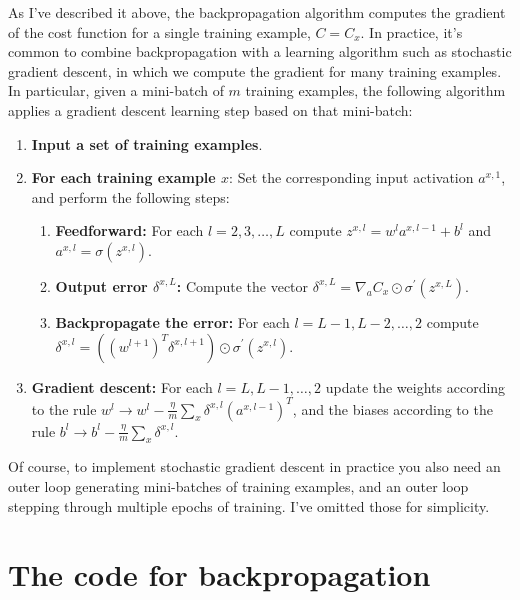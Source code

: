 As I've described it above, the backpropagation algorithm computes the gradient of the cost function for a single training example, $C=C_x$. In practice, it's common to combine backpropagation with a learning algorithm such as stochastic gradient descent, in which we compute the gradient for many training examples. In particular, given a mini-batch of $m$ training examples, the following algorithm applies a gradient descent learning step based on that mini-batch: 
\begin{enumerate}
\item
\textbf{Input a set of training examples}.
 
\item
\textbf{For each training example $x$}:
Set the corresponding input activation $a^{x,1}$, and perform the following steps:
\begin{enumerate}
\item
\textbf{Feedforward:} For each $l=2,3,\ldots,L$ compute $z^{x, l}=w^{l} a^{x, l-1}+b^{l}$ and $a^{x, l}=\sigma\left(z^{x, l}\right)$.

\item
\textbf{Output error $\delta^{x,L}$:} Compute the vector $\delta^{x, L}=\nabla_{a} C_{x} \odot \sigma^{\prime}\left(z^{x, L}\right)$.
\item

\textbf{Backpropagate the error:} For each $l=L-1,L-2,\ldots,2$ compute $\delta^{x, l}=\left(\left(w^{l+1}\right)^{T} \delta^{x, l+1}\right) \odot \sigma^{\prime}\left(z^{x, l}\right)$.

\end{enumerate} 

\item
\textbf{Gradient descent:} For each $l=L,L-1,\ldots,2$ update the weights according to the rule $w^{l} \rightarrow w^{l}-\frac{\eta}{m} \sum_{x} \delta^{x, l}\left(a^{x, l-1}\right)^{T}$, and the biases according to the rule $b^{l} \rightarrow b^{l}-\frac{\eta}{m} \sum_{x} \delta^{x, l}$.

\end{enumerate}

Of course, to implement stochastic gradient descent in practice you also need an outer loop generating mini-batches of training examples, and an outer loop stepping through multiple epochs of training. I've omitted those for simplicity. 

\section{The code for backpropagation}
\label{sec:Thecodeforbackpropagation}

